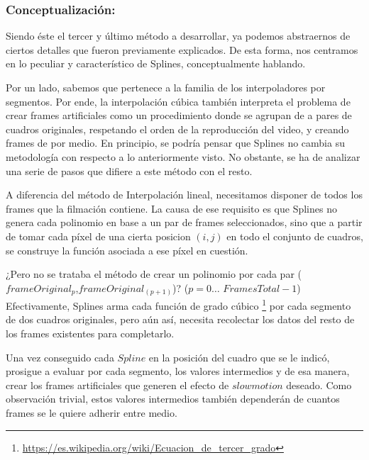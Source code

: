\subsubsection*{\bf{Conceptualizaci\'on:}}

Siendo \'este el tercer y \'ultimo m\'etodo a desarrollar, ya podemos abstraernos de ciertos detalles que fueron previamente explicados. De esta forma, nos centramos en lo peculiar y caracter\'istico de Splines, conceptualmente hablando.

Por un lado, sabemos que pertenece a la familia de los interpoladores por segmentos. Por ende, la interpolaci\'on c\'ubica tambi\'en interpreta el problema de crear frames artificiales como un procedimiento donde se agrupan de a pares de cuadros originales, respetando el orden de la reproducci\'on del video, y creando frames de por medio. En principio, se podr\'ia pensar que Splines no cambia su metodolog\'ia con respecto a lo anteriormente visto. No obstante, se ha de analizar una serie de pasos que difiere a este m\'etodo con el resto.

A diferencia del m\'etodo de Interpolaci\'on lineal, necesitamos disponer de todos los frames que la filmaci\'on contiene. La causa de ese requisito es que Splines no genera cada polinomio en base a un par de frames seleccionados, sino que a partir de tomar cada p\'ixel de una cierta posicion $(i,j)$ en todo el conjunto de cuadros, se construye la funci\'on asociada a ese p\'ixel en cuesti\'on. 

¿Pero no se trataba el m\'etodo de crear un polinomio por cada par ($frameOriginal_{p}$,$frameOriginal_{(p+1)}$)? ($p = 0 \ldots$ $FramesTotal-1$) Efectivamente, Splines arma cada funci\'on de grado c\'ubico \footnote{\url{https://es.wikipedia.org/wiki/Ecuacion_de_tercer_grado}} por cada segmento de dos cuadros originales, pero a\'un as\'i, necesita recolectar los datos del resto de los frames existentes para completarlo.

Una vez conseguido cada $Spline$ en la posici\'on del cuadro que se le indic\'o, prosigue a evaluar por cada segmento, los valores intermedios y de esa manera, crear los frames artificiales que generen el efecto de $slowmotion$ deseado. Como observaci\'on trivial, estos valores intermedios tambi\'en depender\'an de cuantos frames se le quiere adherir entre medio.


 